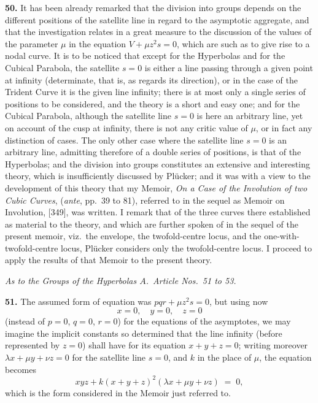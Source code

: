 \documentclass[11pt,a4paper]{article}
\begin{document}
\textbf{50.} It has been already remarked that the division into groups depends on the different positions of the satellite line in regard to the asymptotic aggregate, and that the investigation relates in a great measure to the discussion of the values of the parameter $\mu$ in the equation $V + \mu z^{2}s = 0$, which are such as to give rise to a nodal curve. It is to be noticed that except for the Hyperbolas and for the Cubical Parabola, the satellite $s=0$ is either a line passing through a given point at infinity (determinate, that is, as regards its direction), or in the case of the Trident Curve it is the given line infinity; there is at most only a single series of positions to be considered, and the theory is a short and easy one; and for the Cubical Parabola, although the satellite line $s=0$ is here an arbitrary line, yet on account of the cusp at infinity, there is not any critic value of $\mu$, or in fact any distinction of cases. The only other case where the satellite line $s=0$ is an arbitrary line, admitting therefore of a double series of positions, is that of the Hyperbolas; and the division into groups constitutes an extensive and interesting theory, which is insufficiently discussed by Pl\"ucker; and it was with a view to the development of this theory that my Memoir, \emph{On a Case of the Involution of two Cubic Curves}, (\emph{ante}, pp.~39 to 81), referred to in the sequel as Memoir on Involution, [349], was written. I remark that of the three curves there established as material to the theory, and which are further spoken of in the sequel of the present memoir, viz.\ the envelope, the twofold-centre locus, and the one-with-twofold-centre locus, Pl\"ucker considers only the twofold-centre locus. I proceed to apply the results of that Memoir to the present theory.

\medskip

\noindent\textit{As to the Groups of the Hyperbolas $A$.\ Article Nos.\ 51 to 53.}

\medskip

\textbf{51.} The assumed form of equation was $pqr + \mu z^{2}s = 0$, but using now
\[
x=0,\quad y=0,\quad z=0
\]
(instead of $p=0$, $q=0$, $r=0$) for the equations of the asymptotes, we may imagine the implicit constants so determined that the line infinity (before represented by $z=0$) shall have for its equation $x+y+z=0$; writing moreover $\lambda x + \mu y + \nu z = 0$ for the satellite line $s=0$, and $k$ in the place of $\mu$, the equation becomes
\[
xyz + k(x+y+z)^{2}(\lambda x + \mu y + \nu z) \;=\; 0,
\]
which is the form considered in the Memoir just referred to.
\end{document}
